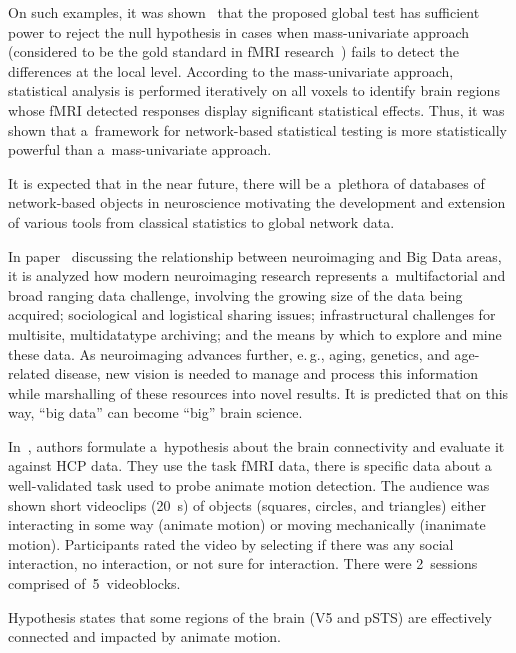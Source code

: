 \begin{multicols}{2}
  On such examples, it was shown~\cite{64-kl} that the proposed global test has
sufficient power to reject the null hypothesis in cases when mass-univariate approach
(considered to be the gold standard in fMRI research~\cite{70-kl}) fails to detect the
differences at the local level. According to the mass-univariate approach, statistical
analysis is performed iteratively on all voxels to identify brain regions whose fMRI
detected responses display significant statistical effects. Thus,
it was shown that a~framework for network-based statistical testing is more
statistically powerful than a~mass-univariate approach.

  It is expected that in the near future, there will be a~plethora of databases of
network-based objects in neuroscience motivating the development and extension of
various tools from classical statistics to global network data.


  In paper~\cite{71-kl} discussing the relationship between neuroimaging and
Big Data areas, it is analyzed how modern neuroimaging research represents a~multifactorial and broad ranging data challenge, involving the growing size of the
data being acquired; sociological and logistical sharing issues; infrastructural
challenges for multisite, multidatatype archiving; and the means by which to
explore and mine these data. As neuroimaging advances further, e.\,g., aging,
genetics, and age-related disease, new vision is needed to manage and process this
information while marshalling of these resources into novel results.
It is predicted
that on this way, ``big data'' can become ``big'' brain science.

  In~\cite{72-kl}, authors formulate a~hypothesis about the brain connectivity and
evaluate it against HCP data. They use the task fMRI data, there is specific data about
a well-validated task used to probe animate motion detection. The audience was
shown short videoclips (20~s) of objects (squares, circles, and triangles) either
interacting in some way (animate motion) or moving mechanically (inanimate
motion). Participants rated the video by selecting if there was any social interaction,
no interaction, or not sure for interaction. There were 2~sessions comprised
of~5~videoblocks.

  Hypothesis states that some regions of the brain (V5 and pSTS) are effectively
connected and impacted by animate motion.


\end{multicols}

